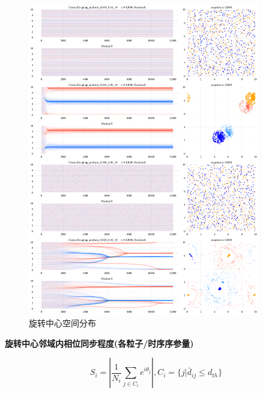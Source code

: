 \documentclass{article}
\begin{document}
\begin{figure}[H]
	\centering
	\includegraphics[width=0.9\textwidth]{./figs/totalXY.png}
	\caption{旋转中心空间分布}
	\label{fig:fig234t.1}
\end{figure}

\newpage
\noindent\textbf{旋转中心邻域内相位同步程度(各粒子/时序序参量)}

$$S_{i}=\left|\frac{1}{N_{i}}\sum_{j\in C_{i}}e^{i\theta_{j}}\right|,C_{i}=\{j|\bar{d}_{ij}\leq d_{th}\}$$
\end{document}
